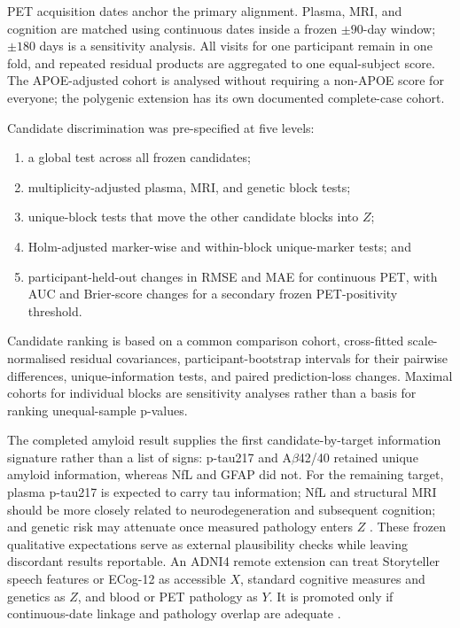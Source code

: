 \documentclass[11pt]{article}
\theoremstyle{definition}
\begin{document}
PET acquisition dates anchor the primary alignment. Plasma, MRI, and cognition are matched
using continuous dates inside a frozen $\pm90$-day window; $\pm180$ days is a sensitivity
analysis. All visits for one participant remain in one fold, and repeated residual products
are aggregated to one equal-subject score. The APOE-adjusted cohort is analysed without
requiring a non-APOE score for everyone; the polygenic extension has its own documented
complete-case cohort.

Candidate discrimination was pre-specified at five levels:
\begin{enumerate}[leftmargin=*]
\item a global test across all frozen candidates;
\item multiplicity-adjusted plasma, MRI, and genetic block tests;
\item unique-block tests that move the other candidate blocks into $Z$;
\item Holm-adjusted marker-wise and within-block unique-marker tests; and
\item participant-held-out changes in RMSE and MAE for continuous PET, with AUC and Brier-score
changes for a secondary frozen PET-positivity threshold.
\end{enumerate}
Candidate ranking is based on a common comparison cohort, cross-fitted scale-normalised residual covariances,
participant-bootstrap intervals for their pairwise differences, unique-information tests,
and paired prediction-loss changes. Maximal cohorts for individual blocks are sensitivity
analyses rather than a basis for ranking unequal-sample p-values.

The completed amyloid result supplies the first candidate-by-target information signature rather than a
list of signs: p-tau217 and A$\beta$42/40 retained unique amyloid information, whereas NfL and
GFAP did not. For the remaining target, plasma p-tau217 is expected to carry tau information;
NfL and structural MRI should be more closely
related to neurodegeneration and subsequent cognition; and genetic risk may attenuate once
measured pathology enters $Z$ \cite{janelidze2024,moon2025}. These frozen qualitative
expectations serve as external plausibility checks while leaving discordant results reportable. An ADNI4 remote extension can treat
Storyteller speech features or ECog-12 as accessible $X$, standard cognitive measures and
genetics as $Z$, and blood or PET pathology as $Y$. It is promoted only if continuous-date
linkage and pathology overlap are adequate \cite{skirrow2024}.
\end{document}
